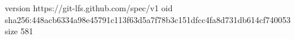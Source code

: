 version https://git-lfs.github.com/spec/v1
oid sha256:448acb6334a98e45791c113f63d5a7f78b3c151dfcc4fa8d731db614cf740053
size 581
